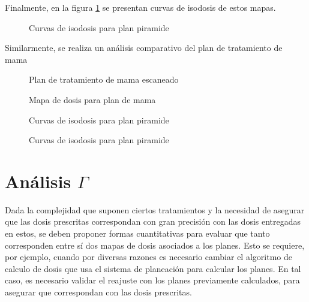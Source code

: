 Finalmente, en la figura \ref{fig:isodosisPiramide}  se presentan curvas de isodosis de estos mapas.\\ 
\begin{figure}
	\centering
	
	\caption{Curvas de isodosis para plan piramide }
	\label{fig:isodosisPiramide}
\end{figure}

Similarmente, se realiza un análisis comparativo del plan de tratamiento de mama 
\begin{figure}
	\centering
	
	\caption{Plan de tratamiento de mama escaneado }
	\label{fig:mamaEscaneada}
\end{figure}
\begin{figure}
	\centering
	
	\caption{Mapa de dosis para plan de mama }
	\label{fig:mapaMama}
\end{figure}
\begin{figure}
	\centering
	
	\caption{Curvas de isodosis para plan piramide }
	\label{fig:histogramaMama}
\end{figure}
\begin{figure}
	\centering
	
	\caption{Curvas de isodosis para plan piramide }
	\label{fig:isodosisMama}
\end{figure}
\section{Análisis $\Gamma$}
Dada la complejidad que suponen ciertos tratamientos y la necesidad de asegurar que las dosis prescritas correspondan con gran precisión con las dosis entregadas en estos, se deben proponer formas cuantitativas para evaluar que tanto corresponden entre sí dos mapas de dosis asociados a los planes. Esto se requiere, por ejemplo, cuando por diversas razones es necesario cambiar el algoritmo de calculo de dosis que usa el sistema de planeación para calcular los planes. En tal caso, es necesario validar el reajuste con los planes previamente calculados, para asegurar que correspondan con las dosis prescritas.\cite{Winiecki2009}\cite{Li2011}\\

